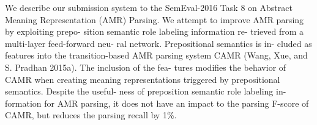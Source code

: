 We describe our submission system to the SemEval-2016 Task 8 on Abstract Meaning Representation (AMR) Parsing. We attempt to improve AMR parsing by exploiting prepo- sition semantic role labeling information re- trieved from a multi-layer feed-forward neu- ral network. Prepositional semantics is in- cluded as features into the transition-based AMR parsing system CAMR (Wang, Xue, and S. Pradhan 2015a). The inclusion of the fea- tures modifies the behavior of CAMR when creating meaning representations triggered by prepositional semantics. Despite the useful- ness of preposition semantic role labeling in- formation for AMR parsing, it does not have an impact to the parsing F-score of CAMR, but reduces the parsing recall by 1\%.
